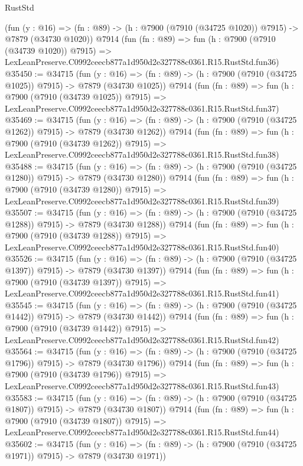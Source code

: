 \begin{lexlean}{RustStd}
\begin{coremodule}
    (fun (y : @16) =>
    (fn : @89) -> (h : @7900 (@7910 (@34725 @1020)) @7915) -> @7879 (@34730 @1020))
    @7914
    (fun (fn : @89) =>
    fun (h : @7900 (@7910 (@34739 @1020)) @7915) =>
    LexLeanPreserve.C0992ceecb877a1d950d2e327788c0361.R15.RustStd.fun36)
@35450 := @34715
    (fun (y : @16) =>
    (fn : @89) -> (h : @7900 (@7910 (@34725 @1025)) @7915) -> @7879 (@34730 @1025))
    @7914
    (fun (fn : @89) =>
    fun (h : @7900 (@7910 (@34739 @1025)) @7915) =>
    LexLeanPreserve.C0992ceecb877a1d950d2e327788c0361.R15.RustStd.fun37)
@35469 := @34715
    (fun (y : @16) =>
    (fn : @89) -> (h : @7900 (@7910 (@34725 @1262)) @7915) -> @7879 (@34730 @1262))
    @7914
    (fun (fn : @89) =>
    fun (h : @7900 (@7910 (@34739 @1262)) @7915) =>
    LexLeanPreserve.C0992ceecb877a1d950d2e327788c0361.R15.RustStd.fun38)
@35488 := @34715
    (fun (y : @16) =>
    (fn : @89) -> (h : @7900 (@7910 (@34725 @1280)) @7915) -> @7879 (@34730 @1280))
    @7914
    (fun (fn : @89) =>
    fun (h : @7900 (@7910 (@34739 @1280)) @7915) =>
    LexLeanPreserve.C0992ceecb877a1d950d2e327788c0361.R15.RustStd.fun39)
@35507 := @34715
    (fun (y : @16) =>
    (fn : @89) -> (h : @7900 (@7910 (@34725 @1288)) @7915) -> @7879 (@34730 @1288))
    @7914
    (fun (fn : @89) =>
    fun (h : @7900 (@7910 (@34739 @1288)) @7915) =>
    LexLeanPreserve.C0992ceecb877a1d950d2e327788c0361.R15.RustStd.fun40)
@35526 := @34715
    (fun (y : @16) =>
    (fn : @89) -> (h : @7900 (@7910 (@34725 @1397)) @7915) -> @7879 (@34730 @1397))
    @7914
    (fun (fn : @89) =>
    fun (h : @7900 (@7910 (@34739 @1397)) @7915) =>
    LexLeanPreserve.C0992ceecb877a1d950d2e327788c0361.R15.RustStd.fun41)
@35545 := @34715
    (fun (y : @16) =>
    (fn : @89) -> (h : @7900 (@7910 (@34725 @1442)) @7915) -> @7879 (@34730 @1442))
    @7914
    (fun (fn : @89) =>
    fun (h : @7900 (@7910 (@34739 @1442)) @7915) =>
    LexLeanPreserve.C0992ceecb877a1d950d2e327788c0361.R15.RustStd.fun42)
@35564 := @34715
    (fun (y : @16) =>
    (fn : @89) -> (h : @7900 (@7910 (@34725 @1796)) @7915) -> @7879 (@34730 @1796))
    @7914
    (fun (fn : @89) =>
    fun (h : @7900 (@7910 (@34739 @1796)) @7915) =>
    LexLeanPreserve.C0992ceecb877a1d950d2e327788c0361.R15.RustStd.fun43)
@35583 := @34715
    (fun (y : @16) =>
    (fn : @89) -> (h : @7900 (@7910 (@34725 @1807)) @7915) -> @7879 (@34730 @1807))
    @7914
    (fun (fn : @89) =>
    fun (h : @7900 (@7910 (@34739 @1807)) @7915) =>
    LexLeanPreserve.C0992ceecb877a1d950d2e327788c0361.R15.RustStd.fun44)
@35602 := @34715
    (fun (y : @16) =>
    (fn : @89) -> (h : @7900 (@7910 (@34725 @1971)) @7915) -> @7879 (@34730 @1971))

\end{coremodule}
\end{lexlean}

